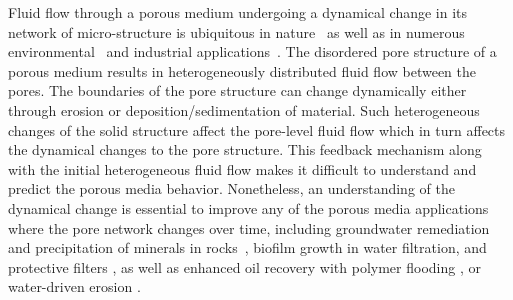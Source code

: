 \documentclass[%
reprint,
 amsmath,amssymb,
 aps,
prl,
]{revtex4-1}
\begin{document}
Fluid flow through a porous medium undergoing a dynamical change in its network of micro-structure is ubiquitous in nature~\cite{marbach2016pruning,alim2013random,tero2010rules,heaton2010growth} as well as in numerous environmental~\cite{schlesinger1999carbon,winkler1979pore,batzle1992seismic,cohen2015mechanisms} and industrial applications~\cite{duduta2011semi,sun2019hierarchical,smith2017multiphase,ferguson2012nonequilibrium}.
The disordered pore structure of a porous medium results in heterogeneously distributed fluid flow between the pores.
The boundaries of the pore structure can change dynamically either through erosion or deposition/sedimentation of material. Such heterogeneous changes of the solid structure affect the pore-level fluid flow which in turn affects the dynamical changes to the pore structure. This feedback mechanism along with the initial heterogeneous fluid flow makes it difficult to understand and predict the porous media behavior. Nonetheless, an understanding of the dynamical change is essential to improve any of the porous media applications where the pore network changes over time, including groundwater remediation and precipitation of minerals in rocks~\cite{rad2013pore}, biofilm growth in water filtration, and protective filters \cite{herzig1970flow,tien1979advances,jaisi2008transport,carrel2018biofilms,seymour2004anomalous}, as well as enhanced oil recovery with polymer flooding \cite{lake2014fundamentals,parsa2020origin}, or water-driven erosion \cite{schorghofer2004spontaneous,mahadevan2012flow}. 
\end{document}
